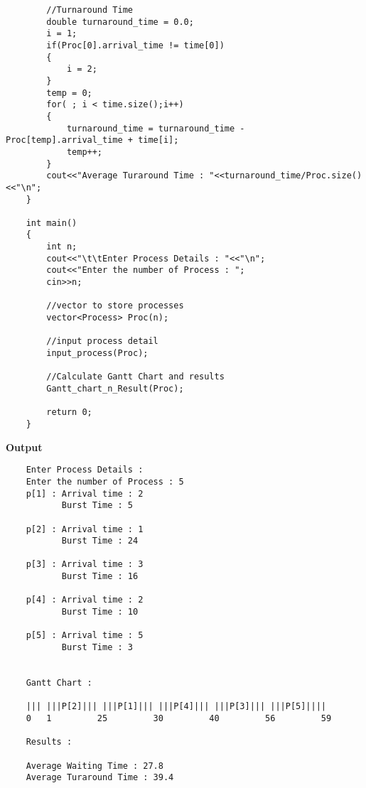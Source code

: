 \documentclass{article}
\begin{document}
\begin{enumerate}
{\begin{verbatim}
        //Turnaround Time
        double turnaround_time = 0.0;
        i = 1;
        if(Proc[0].arrival_time != time[0])
        {
            i = 2;
        }
        temp = 0;
        for( ; i < time.size();i++)
        {
            turnaround_time = turnaround_time - Proc[temp].arrival_time + time[i];
            temp++;
        }
        cout<<"Average Turaround Time : "<<turnaround_time/Proc.size()<<"\n";
    }
    
    int main()
    {
        int n;
        cout<<"\t\tEnter Process Details : "<<"\n";
        cout<<"Enter the number of Process : ";
        cin>>n;
    
        //vector to store processes
        vector<Process> Proc(n);
    
        //input process detail
        input_process(Proc);
    
        //Calculate Gantt Chart and results
        Gantt_chart_n_Result(Proc);
        
        return 0;
    }

\end{verbatim}
\textbf{Output}
\begin{verbatim}
    Enter Process Details : 
    Enter the number of Process : 5
    p[1] : Arrival time : 2
           Burst Time : 5
    
    p[2] : Arrival time : 1
           Burst Time : 24
    
    p[3] : Arrival time : 3
           Burst Time : 16
    
    p[4] : Arrival time : 2
           Burst Time : 10
    
    p[5] : Arrival time : 5
           Burst Time : 3
    
    
    Gantt Chart :
    
    ||| |||P[2]||| |||P[1]||| |||P[4]||| |||P[3]||| |||P[5]||||
    0   1         25         30         40         56         59
    
    Results :
    
    Average Waiting Time : 27.8
    Average Turaround Time : 39.4
\end{verbatim}
}
\end{enumerate}
\end{document}
